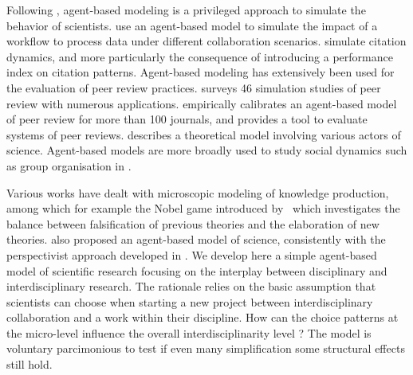 \documentclass[utf8]{frontiersFPHY} %
\begin{document}

Following \cite{giere2010agent}, agent-based modeling is a privileged approach to simulate the behavior of scientists. \cite{shafiee2019agent} use an agent-based model to simulate the impact of a workflow to process data under different collaboration scenarios. \cite{doi10.1162qssa00008} simulate citation dynamics, and more particularly the consequence of introducing a performance index on citation patterns. Agent-based modeling has extensively been used for the evaluation of peer review practices. \cite{feliciani2019scoping} surveys 46 simulation studies of peer review with numerous applications. \cite{kovanis2016complex} empirically calibrates an agent-based model of peer review for more than 100 journals, and provides a tool to evaluate systems of peer reviews. \cite{shneiderman2018twin} describes a theoretical model involving various actors of science. Agent-based models are more broadly used to study social dynamics such as group organisation in \cite{dionne2019diversity}.


Various works have dealt with microscopic modeling of knowledge production, among which for example the Nobel game introduced by~\cite{chavalarias2016s} which investigates the balance between falsification of previous theories and the elaboration of new theories. \cite{giere2010agent} also proposed an agent-based model of science, consistently with the perspectivist approach developed in \cite{giere2010scientific}. We develop here a simple agent-based model of scientific research focusing on the interplay between disciplinary and interdisciplinary research. The rationale relies on the basic assumption that scientists can choose when starting a new project between interdisciplinary collaboration and a work within their discipline. How can the choice patterns at the micro-level influence the overall interdisciplinarity level ? The model is voluntary parcimonious to test if even many simplification some structural effects still hold.
\end{document}
